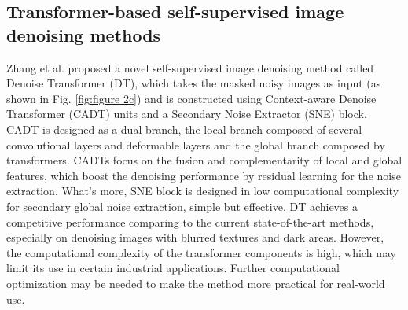 \documentclass[conference]{IEEEtran}
\begin{document}
\subsection{Transformer-based self-supervised image denoising methods}
\noindent Zhang et al. \cite{zhang2023self} proposed a novel self-supervised image denoising method called Denoise Transformer (DT), which takes the masked noisy images as input (as shown in Fig. \ref{fig:figure 2c}) and is constructed using Context-aware Denoise Transformer (CADT) units and a Secondary Noise Extractor (SNE) block. CADT is designed as a dual branch, the local branch composed of several convolutional layers and deformable layers and the global branch composed by transformers. CADTs focus on the fusion and complementarity of local and global features, which boost the denoising performance by residual learning for the noise extraction. What’s more, SNE block is designed in low computational complexity for secondary global noise extraction, simple but effective. DT achieves a competitive performance comparing to the current state-of-the-art methods, especially on denoising images with blurred textures and dark areas. However, the computational complexity of the transformer components is high, which may limit its use in certain industrial applications. Further computational optimization may be needed to make the method more practical for real-world use.
\end{document}
